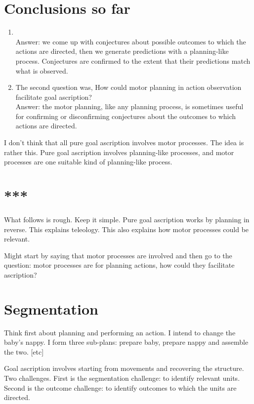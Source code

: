 \documentclass[12pt,\papersize]{extarticle}
\begin{document}
\section{Conclusions so far}

\begin{enumerate}
\item  \theQuestion \\
Answer: we come up with conjectures about possible outcomes to which the actions are directed, then we generate predictions with a planning-like process.  Conjectures are confirmed to the extent that their  predictions match what is observed.
\item The second question was, How could motor planning in action observation facilitate goal ascription?   \\
Answer: the motor planning, like any planning process,  is sometimes useful for confirming or disconfirming conjectures about the outcomes to which actions are directed.
\end{enumerate}
%
I don't think that all pure goal ascription involves motor processes.
The idea is rather this.
Pure goal ascription involves planning-like processes, and motor processes are one suitable kind of planning-like process.





\section{***}
What follows is rough.
Keep it simple.
Pure goal ascription works by planning in reverse.
This explains teleology.
This also explains how motor processes could be relevant.

Might start by saying that motor processes are involved and then go to the question: motor processes are for planning actions, how could they facilitate ascription?


\section{Segmentation}
Think first about planning and performing an action.
I intend to change the baby's nappy.
I form three sub-plans: prepare baby, prepare nappy and assemble the two.
[etc]

Goal ascription involves starting from movements and recovering the structure.
Two challenges.
First is the segmentation challenge: to identify relevant units.
Second is the outcome challenge: to identify outcomes to which the units are directed.
\end{document}
